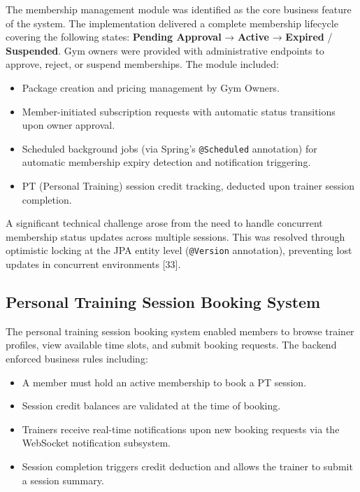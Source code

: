 \documentclass[
  12pt,
  a4paperpaper,
]{report}
\providecommand{\tightlist}{%
  \setlength{\itemsep}{0pt}\setlength{\parskip}{0pt}\setlength{\topsep}{2pt}\setlength{\partopsep}{0pt}}
\begin{document}
The membership management module was identified as the core business
feature of the system. The implementation delivered a complete
membership lifecycle covering the following states: \textbf{Pending
Approval} → \textbf{Active} → \textbf{Expired} / \textbf{Suspended}.
Gym owners were provided with administrative endpoints to approve,
reject, or suspend memberships. The module included:

\begin{itemize}
\tightlist
\item Package creation and pricing management by Gym Owners.
\item Member-initiated subscription requests with automatic status
  transitions upon owner approval.
\item Scheduled background jobs (via Spring's
  \texttt{@Scheduled} annotation) for automatic membership expiry
  detection and notification triggering.
\item PT (Personal Training) session credit tracking, deducted upon
  trainer session completion.
\end{itemize}

A significant technical challenge arose from the need to handle
concurrent membership status updates across multiple sessions. This
was resolved through optimistic locking at the JPA entity level
(\texttt{@Version} annotation), preventing lost updates in concurrent
environments {[}33{]}.

\subsection{Personal Training Session Booking
System}\label{pt-session-booking}

The personal training session booking system enabled members to
browse trainer profiles, view available time slots, and submit
booking requests. The backend enforced business rules including:

\begin{itemize}
\tightlist
\item A member must hold an active membership to book a PT session.
\item Session credit balances are validated at the time of booking.
\item Trainers receive real-time notifications upon new booking
  requests via the WebSocket notification subsystem.
\item Session completion triggers credit deduction and allows the
  trainer to submit a session summary.
\end{itemize}
\end{document}
